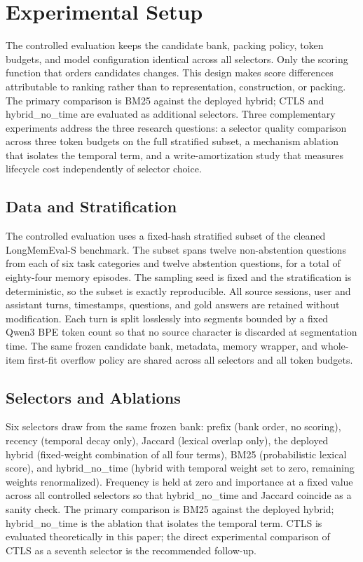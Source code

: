 \section{Experimental Setup}

\label{sec:experiments}

The controlled evaluation keeps the candidate bank, packing policy, token budgets, and model configuration identical across all selectors. Only the scoring function that orders candidates changes. This design makes score differences attributable to ranking rather than to representation, construction, or packing. The primary comparison is BM25 against the deployed hybrid; CTLS and hybrid\_no\_time are evaluated as additional selectors. Three complementary experiments address the three research questions: a selector quality comparison across three token budgets on the full stratified subset, a mechanism ablation that isolates the temporal term, and a write-amortization study that measures lifecycle cost independently of selector choice.

\subsection{Data and Stratification}

\label{sec:setup_data}

The controlled evaluation uses a fixed-hash stratified subset of the cleaned LongMemEval-S benchmark. The subset spans twelve non-abstention questions from each of six task categories and twelve abstention questions, for a total of eighty-four memory episodes. The sampling seed is fixed and the stratification is deterministic, so the subset is exactly reproducible. All source sessions, user and assistant turns, timestamps, questions, and gold answers are retained without modification. Each turn is split losslessly into segments bounded by a fixed Qwen3 BPE token count so that no source character is discarded at segmentation time. The same frozen candidate bank, metadata, memory wrapper, and whole-item first-fit overflow policy are shared across all selectors and all token budgets.

\subsection{Selectors and Ablations}

\label{sec:setup_selectors}

Six selectors draw from the same frozen bank: prefix (bank order, no scoring), recency (temporal decay only), Jaccard (lexical overlap only), the deployed hybrid (fixed-weight combination of all four terms), BM25 (probabilistic lexical score), and hybrid\_no\_time (hybrid with temporal weight set to zero, remaining weights renormalized). Frequency is held at zero and importance at a fixed value across all controlled selectors so that hybrid\_no\_time and Jaccard coincide as a sanity check. The primary comparison is BM25 against the deployed hybrid; hybrid\_no\_time is the ablation that isolates the temporal term. CTLS is evaluated theoretically in this paper; the direct experimental comparison of CTLS as a seventh selector is the recommended follow-up.

